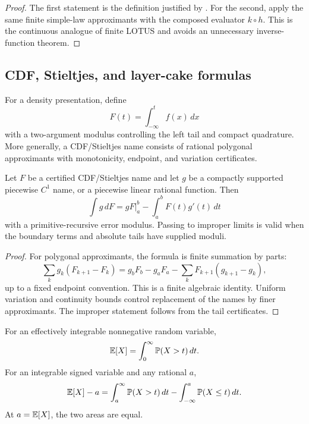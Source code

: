 \begin{proof}
The first statement is the definition justified by
.  For the second, apply the same finite simple-law
approximants with the composed evaluator \(k\circ h\).  This is the continuous
analogue of finite LOTUS and avoids an unnecessary inverse-function theorem.
\end{proof}

\subsection{CDF, Stieltjes, and layer-cake formulas}

\begin{definition}\label{def:cdf}
For a density presentation, define
\[
 F(t)=\int_{-\infty}^{t}f(x)\,dx
\]
with a two-argument modulus controlling the left tail and compact quadrature.
More generally, a CDF/Stieltjes name consists of rational polygonal
approximants with monotonicity, endpoint, and variation certificates.
\end{definition}

\begin{theorem}\label{thm:stieltjes}
Let \(F\) be a certified CDF/Stieltjes name and let \(g\) be a compactly
supported piecewise \(C^1\) name, or a piecewise linear rational function.
Then
\[
 \int g\,dF=gF\big|_{a}^{b}-\int_a^bF(t)g'(t)\,dt
\]
with a primitive-recursive error modulus.  Passing to improper limits is valid
when the boundary terms and absolute tails have supplied moduli.
\end{theorem}

\begin{proof}
For polygonal approximants, the formula is finite summation by parts:
\[
 \sum_k g_k(F_{k+1}-F_k)
 =g_bF_b-g_aF_a-\sum_kF_{k+1}(g_{k+1}-g_k),
\]
up to a fixed endpoint convention.  This is a finite algebraic identity.
Uniform variation and continuity bounds control replacement of the names by
finer approximants.  The improper statement follows from the tail certificates.
\end{proof}

\begin{theorem}\label{thm:layer-cake}
For an effectively integrable nonnegative random variable,
\[
 \mathbb E[X]=\int_0^\infty\mathbb P(X>t)\,dt.
\]
For an integrable signed variable and any rational \(a\),
\[
 \mathbb E[X]-a
 =\int_a^\infty\mathbb P(X>t)\,dt
  -\int_{-\infty}^{a}\mathbb P(X\le t)\,dt.
\]
At \(a=\mathbb E[X]\), the two areas are equal.
\end{theorem}

